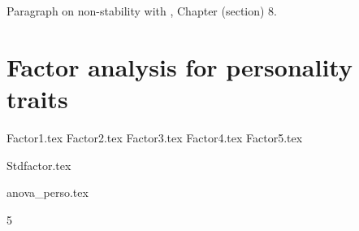 \documentclass[a4paper, 11pt, onecolumn]{article}
\begin{document}
Paragraph on non-stability with \cite{Almlund2011}, Chapter (section) 8.


\clearpage
\newpage
\section{Factor analysis for personality traits}
\label{section:efa_big5}

{Factor1.tex}
{Factor2.tex}
{Factor3.tex}
{Factor4.tex}
{Factor5.tex}

{Stdfactor.tex}

{anova_perso.tex}






\clearpage
\newpage
\setcounter{tocdepth}5
\tableofcontents

\end{document}
